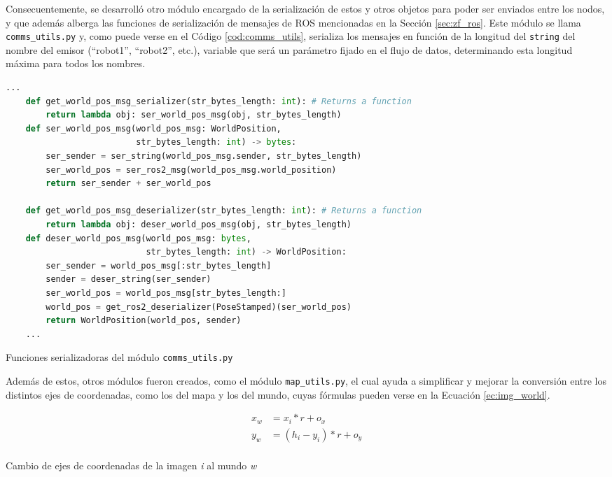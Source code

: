 Consecuentemente, se desarrolló otro módulo encargado de la serialización de
estos y otros objetos para poder ser enviados entre los nodos, y que además
alberga las funciones de serialización de mensajes de ROS mencionadas en la
Sección \ref{sec:zf_ros}.
Este módulo se llama \texttt{comms\_utils.py} y, como puede verse en el Código
\ref{cod:comms_utils}, serializa los mensajes en función de la longitud del
\texttt{string} del nombre del emisor (``robot1'', ``robot2'', etc.), variable
que será un parámetro fijado en el flujo de datos, determinando esta longitud
máxima para todos los nombres.
\\

\begin{code}[h!]
  \begin{lstlisting}[language=Python]
    ...
    def get_world_pos_msg_serializer(str_bytes_length: int): # Returns a function
        return lambda obj: ser_world_pos_msg(obj, str_bytes_length)
    def ser_world_pos_msg(world_pos_msg: WorldPosition,
                          str_bytes_length: int) -> bytes:
        ser_sender = ser_string(world_pos_msg.sender, str_bytes_length)
        ser_world_pos = ser_ros2_msg(world_pos_msg.world_position)
        return ser_sender + ser_world_pos

    def get_world_pos_msg_deserializer(str_bytes_length: int): # Returns a function
        return lambda obj: deser_world_pos_msg(obj, str_bytes_length)
    def deser_world_pos_msg(world_pos_msg: bytes,
                            str_bytes_length: int) -> WorldPosition:
        ser_sender = world_pos_msg[:str_bytes_length]
        sender = deser_string(ser_sender)
        ser_world_pos = world_pos_msg[str_bytes_length:]
        world_pos = get_ros2_deserializer(PoseStamped)(ser_world_pos)
        return WorldPosition(world_pos, sender)
    ...
  \end{lstlisting}
\caption[Funciones serializadoras del módulo \texttt{comms\_utils.py}]{Funciones serializadoras del módulo \texttt{comms\_utils.py}}
\label{cod:comms_utils}
\end{code}

Además de estos, otros módulos fueron creados, como el módulo
\texttt{map\_utils.py}, el cual ayuda a simplificar y mejorar la conversión
entre los distintos ejes de coordenadas, como los del mapa y los del mundo,
cuyas fórmulas pueden verse en la Ecuación \ref{ec:img_world}.
\\

\begin{myequation}[h!]
  \begin{equation}
  \begin{aligned}
  x_w &= x_i * r + o_x  \\
  y_w &= (h_i - y_i) * r + o_y  \\
  \end{aligned}
  \label{ec:img_world}
  \end{equation}
  \caption[Cambio de ejes de coordenadas de la imagen \textit{i} al mundo \textit{w}]{Cambio de ejes de coordenadas de la imagen \textit{i} al mundo \textit{w}}
\end{myequation}

